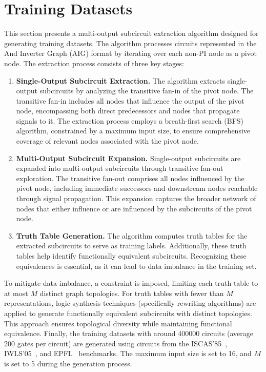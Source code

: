 \section{Training Datasets}
\label{appendix:dataset}
This section presents a multi-output subcircuit extraction algorithm designed for generating training datasets.
The algorithm processes circuits represented in the And Inverter Graph (AIG) format by iterating over each non-PI node as a pivot node. 
The extraction process consists of three key stages:
\begin{enumerate}
    \item \textbf{Single-Output Subcircuit Extraction.} 
The algorithm extracts single-output subcircuits by analyzing the transitive fan-in of the pivot node. 
The transitive fan-in includes all nodes that influence the output of the pivot node, encompassing both direct predecessors and nodes that propagate signals to it. 
The extraction process employs a breath-first search (BFS) algorithm, constrained by a maximum input size, to ensure comprehensive coverage of relevant nodes associated with the pivot node.
    \item \textbf{Multi-Output Subcircuit Expansion.} 
Single-output subcircuits are expanded into multi-output subcircuits through transitive fan-out exploration. 
The transitive fan-out comprises all nodes influenced by the pivot node, including immediate successors and downstream nodes reachable through signal propagation. 
This expansion captures the broader network of nodes that either influence or are influenced by the subcircuits of the pivot node.
    \item \textbf{Truth Table Generation.} 
The algorithm computes truth tables for the extracted subcircuits to serve as training labels. 
Additionally, these truth tables help identify functionally equivalent subcircuits.
Recognizing these equivalences is essential, as it can lead to data imbalance in the training set.
\end{enumerate}

To mitigate data imbalance, a constraint is imposed, limiting each truth table to at most $M$ distinct graph topologies. 
For truth tables with fewer than $M$ representations, logic synthesis techniques (specifically rewriting algorithms) are applied to generate functionally equivalent subcircuits with distinct topologies. 
This approach ensures topological diversity while maintaining functional equivalence.
Finally, the training datasets with around 400000 circuits (average 200 gates per circuit) are generated using circuits from the ISCAS'85~\cite{bryan1985iscas}, IWLS'05~\cite{albrecht2005iwls}, and EPFL~\cite{amaru2015epfl} benchmarks. 
The maximum input size is set to 16, and $M$ is set to 5 during the generation process. 

